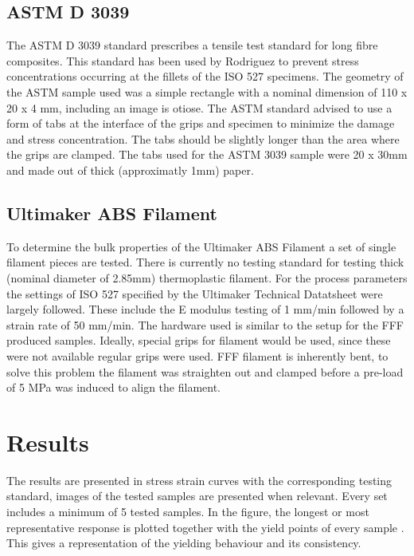 \subsection{ASTM D 3039}
The ASTM D 3039 standard \cite{Afd2016NEN-EN-ISO527-2} prescribes a tensile test standard for long fibre composites. This standard has been used by Rodriguez \cite{Rodriguez2001MechanicalInvestigation} to prevent  stress concentrations occurring at the fillets of the ISO 527 specimens. The geometry of the ASTM sample used was a simple rectangle with a nominal dimension of 110 x 20 x 4 mm, including an image is otiose. The ASTM standard advised to use a form of tabs at the interface of the grips and specimen to minimize the damage and stress concentration. The tabs should be slightly longer than the area where the grips are clamped. The tabs used for the ASTM 3039 sample were 20 x 30mm and made out of thick (approximatly 1mm) paper.

\subsection{Ultimaker ABS Filament}
To determine the bulk properties of the Ultimaker ABS Filament a set of single filament pieces are tested. There is currently no testing standard for testing thick (nominal diameter of 2.85mm) thermoplastic filament. For the process parameters the settings of ISO 527 specified by the Ultimaker Technical Datatsheet \cite{Ultimaker2018TechnicalABS} were largely followed. These include the E modulus testing of 1 mm/min followed by a strain rate of 50 mm/min. The hardware used is similar to the setup for the FFF produced samples. Ideally, special grips for filament would be used, since these were not available regular grips were used. 
FFF filament is inherently bent, to solve this problem the filament was straighten out and clamped before a pre-load of 5 MPa was induced to align the filament. 

\section{Results}
The results are presented in stress strain curves with the corresponding testing standard, images of the tested samples are presented when relevant. Every set includes a minimum of 5 tested samples. In the figure, the longest or most representative response is plotted together with the yield points of every sample . This gives a representation of the yielding behaviour and its consistency. 

